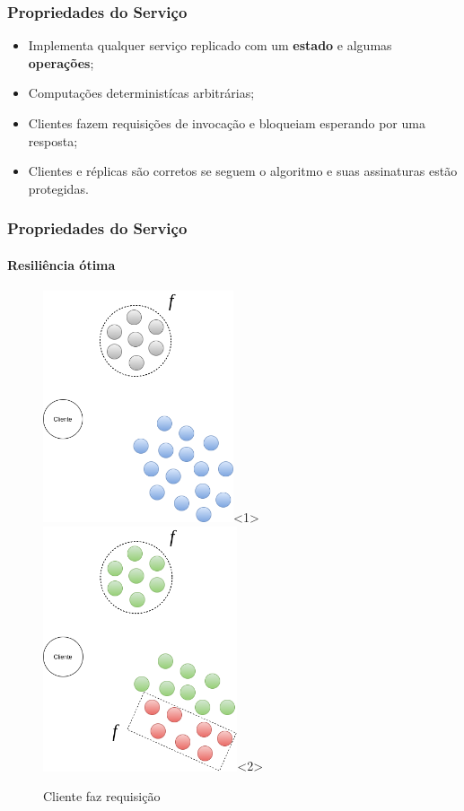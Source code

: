 \documentclass{beamer}
\begin{document}
\begin{frame}
  \frametitle{Propriedades do Serviço}

  \begin{itemize}
    \item
      Implementa qualquer serviço replicado com um \textbf{estado} e algumas \textbf{operações};

    \item
      Computações deterministícas arbitrárias;

    \item
      Clientes fazem requisições de invocação e bloqueiam esperando por uma resposta;

    \item
      Clientes e réplicas são corretos se seguem o algoritmo e suas assinaturas estão protegidas.
  \end{itemize}
\end{frame}

\begin{frame}
  \frametitle{Propriedades do Serviço}
  \framesubtitle{Resiliência ótima}

  \begin{figure}
    \includegraphics[width=0.5\textwidth]{images/resiliencia01}<1>
    \includegraphics[width=0.51\textwidth]{images/resiliencia02}<2>
    \caption{Cliente faz requisição}
  \end{figure}

\end{frame}
\end{document}
